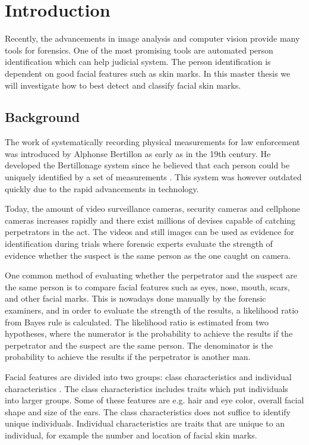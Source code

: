 \chapter{Introduction}\label{cha:intro}

Recently, the advancements in image analysis and computer vision provide many tools for forensics. One of the most promising tools are automated person identification which can help judicial system. The person identification is dependent on good facial features such as skin marks. In this master thesis we will investigate how to best detect and classify facial skin marks. 

\section{Background}

The work of systematically recording physical measurements for law enforcement was introduced by Alphonse Bertillon as early as in the 19th century. He developed the Bertillonage system since he believed that each person could be uniquely identified by a set of measurements \cite{Bertillon}. This system was however outdated quickly due to the rapid advancements in technology.

Today, the amount of video surveillance cameras, security cameras and cellphone cameras increases rapidly and there exist millions of devises capable of catching perpetrators in the act. The videos and still images can be used as evidence for identification during trials where forensic experts evaluate the strength of evidence whether the suspect is the same person as the one caught on camera.

One common method of evaluating whether the perpetrator and the suspect are the same person is to compare facial features such as eyes, nose, mouth, scars, and other facial marks. This is nowadays done manually \cite{face_soft} by the forensic examiners, and in order to evaluate the strength of the results, a likelihood ratio \cite{NFC_stat} from Bayes rule is calculated. The likelihood ratio is estimated from two hypotheses, where the numerator is the probability to achieve the results if the perpetrator and the suspect are the same person. The denominator is the probability to achieve the results if the perpetrator is another man. 

Facial features are divided into two groups: class characteristics and individual characteristics \cite{forensic_identification}. The class characteristics includes traits which put individuals into larger groups. Some of these features are e.g. hair and eye color, overall facial shape and size of the ears. The class characteristics does not suffice to identify unique individuals. Individual characteristics are traits that are unique to an individual, for example the number and location of facial skin marks.

